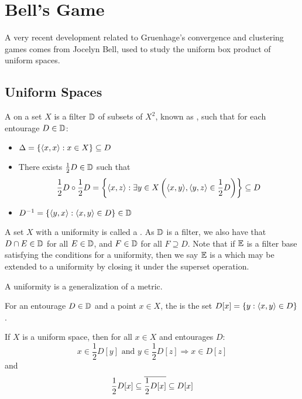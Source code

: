 
\chapter{Bell's Game}

A very recent development related to Gruenhage's convergence and
clustering games comes from
Jocelyn Bell, used to study the uniform box product of uniform spaces.

\section{Uniform Spaces}

\begin{defn}
  A  on a set $X$ is a filter $\mathbb{D}$ of subsets of $X^2$,
  known as , such that for each entourage $D\in\mathbb{D}$:
  \begin{itemize}
    \item $\Delta=\{\langle x,x\rangle:x\in X\}\subseteq D$
    \item There exists $\frac{1}{2}D\in\mathbb{D}$ such that
      \[
        \frac{1}{2}D\circ\frac{1}{2}D
          =
        \left\{\langle x,z\rangle:\exists y\in X\left(\langle x,y\rangle,\langle y,z\rangle\in\frac{1}{2}D\right)\right\}
          \subseteq
        D
      \]
    \item $D^{-1}=\{\langle y,x\rangle:\langle x,y\rangle\in D\}\in \mathbb{D}$
  \end{itemize}
\end{defn}

A set $X$ with a uniformity is called a .
As $\mathbb{D}$ is a filter, we also have that $D\cap E\in \mathbb{D}$ for all
$E\in\mathbb{D}$, and $F\in \mathbb{D}$ for all $F\supseteq D$. Note that if $\mathbb{E}$ is
a filter base satisfying the conditions for a uniformity, then we say
$\mathbb{E}$ is a  which may be extended to a uniformity by
closing it under the superset operation.

A uniformity is a generalization of a metric.

\begin{defn}
  For an entourage $D\in\mathbb{D}$ and a point $x\in X$, the
   is the set $D[x]=\{y:\langle x,y\rangle\in D\}$.
\end{defn}

\begin{prop}
  If $X$ is a uniform space, then for all $x\in X$ and entourages $D$:
    \[
      x\in \frac{1}{2}D[y]\text{ and } y\in\frac{1}{2}D[z] \Rightarrow x\in D[z]
    \]
  and
    \[
      \frac{1}{2}D[x]\subseteq \overline{\frac{1}{2}D[x]}\subseteq D[x]
    \]
\end{prop}

